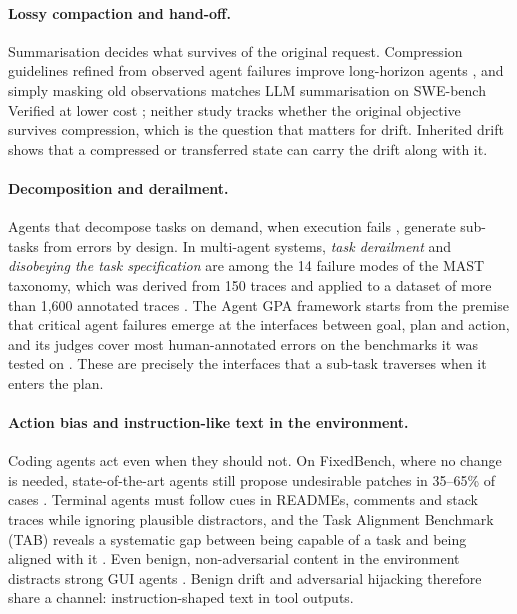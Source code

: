 \paragraph{Lossy compaction and hand-off.} Summarisation decides what survives of the original
request. Compression guidelines refined from observed agent failures improve long-horizon agents
\citep{kang2025acon}, and simply masking old observations matches LLM summarisation on SWE-bench
Verified at lower cost \citep{lindenbauer2025complexity}; neither study tracks whether the original
objective survives compression, which is the question that matters for drift. Inherited drift \citep{menon2026inherited} shows that a compressed or transferred
state can carry the drift along with it.

\paragraph{Decomposition and derailment.} Agents that decompose tasks on demand, when execution fails
\citep{prasad2024adapt}, generate sub-tasks from errors by design. In multi-agent systems,
\emph{task derailment} and \emph{disobeying the task specification} are among the 14 failure modes
of the MAST taxonomy, which was derived from 150 traces and applied to a dataset of more than
1{,}600 annotated traces \citep{cemri2025mast}. The Agent GPA framework starts from the premise that
critical agent failures emerge at the interfaces between goal, plan and action, and its judges
cover most human-annotated errors on the benchmarks it was tested on \citep{jia2025gpa}. These are precisely the interfaces that a sub-task traverses when it enters the
plan.

\paragraph{Action bias and instruction-like text in the environment.} Coding agents act even when they
should not. On FixedBench, where no change is needed, state-of-the-art agents still propose undesirable
patches in 35--65\% of cases \citep{gloaguen2026fixedbench}. Terminal agents must follow cues in
READMEs, comments and stack traces while ignoring plausible distractors, and the Task Alignment
Benchmark (TAB) reveals a systematic gap between being capable of a task and being aligned with
it \citep{mavali2026tab}. Even benign, non-adversarial content in the environment distracts strong GUI
agents \citep{ma2024caution}. Benign drift and adversarial hijacking therefore share a channel:
instruction-shaped text in tool outputs.

